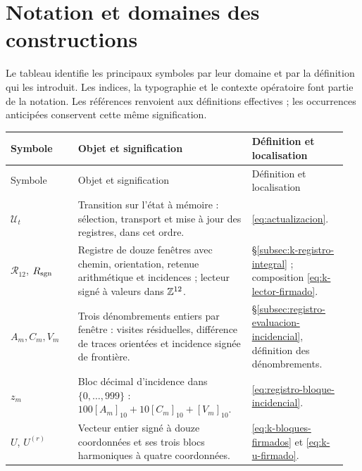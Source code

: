 \section*{Notation et domaines des constructions}
\label{sec:ii-notacion}

Le tableau identifie les principaux symboles par leur domaine et par la
définition qui les introduit. Les indices, la typographie et le contexte
opératoire font partie de la notation. Les références renvoient aux
définitions effectives ; les occurrences anticipées conservent cette
même signification.

\begingroup
\small
\setlength{\tabcolsep}{4pt}
\renewcommand{\arraystretch}{1.12}
\begin{longtable}{@{}>{\raggedright\arraybackslash}p{0.19\linewidth}
                    >{\raggedright\arraybackslash}p{0.49\linewidth}
                    >{\raggedright\arraybackslash}p{0.27\linewidth}@{}}
\toprule
Symbole & Objet et signification & Définition et localisation\\
\midrule
\endfirsthead
\toprule
Symbole & Objet et signification & Définition et localisation\\
\midrule
\endhead
\bottomrule
\endfoot

\(\mathcal U_t\)
& Transition sur l'état à mémoire : sélection, transport et
  mise à jour des registres, dans cet ordre.
& \eqref{eq:actualizacion}.\\[3pt]

\(\mathcal R_{12}\), \(R_{\rm sgn}\)
& Registre de douze fenêtres avec chemin, orientation, retenue arithmétique et incidences ;
  lecteur signé à valeurs dans \(\mathbb Z^{12}\).
& \S\ref{subsec:k-registro-integral} ;
  composition \eqref{eq:k-lector-firmado}.\\[3pt]

\(A_m,C_m,V_m\)
& Trois dénombrements entiers par fenêtre : visites résiduelles, différence de
  traces orientées et incidence signée de frontière.
& \S\ref{subsec:registro-evaluacion-incidencial},
  définition des dénombrements.\\[3pt]

\(z_m\)
& Bloc décimal d'incidence dans \(\{0,\ldots,999\}\) :
  \(100[A_m]_{10}+10[C_m]_{10}+[V_m]_{10}\).
& \eqref{eq:registro-bloque-incidencial}.\\[3pt]

\(U\), \(U^{(r)}\)
& Vecteur entier signé à douze coordonnées et ses trois blocs
  harmoniques à quatre coordonnées.
& \eqref{eq:k-bloques-firmados} et
  \eqref{eq:k-u-firmado}.\\[3pt]


\end{longtable}
